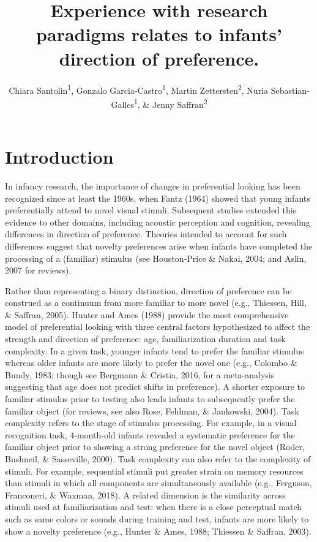 \documentclass[english,man,man,floatsintext]{apa6}
\author{Chiara Santolin\textsuperscript{1}, Gonzalo Garcia-Castro\textsuperscript{1}, Martin Zettersten\textsuperscript{2}, Nuria Sebastian-Galles\textsuperscript{1}, \& Jenny Saffran\textsuperscript{2}}
\affiliation{
\vspace{0.5cm}
\textsuperscript{1} Center for Brain and Cognition, Universitat Pompeu Fabra\\\textsuperscript{2} Waisman Center \& Department of Psychology, University of Wisconsin-Madison}
\title{Experience with research paradigms relates to infants' direction of preference.}
\date{}
\begin{document}
\maketitle

\hypertarget{introduction}{%
\section{Introduction}\label{introduction}}

In infancy research, the importance of changes in preferential looking has been recognized since at least the 1960s, when Fantz (1964) showed that young infants preferentially attend to novel visual stimuli. Subsequent studies extended this evidence to other domains, including acoustic perception and cognition, revealing differences in direction of preference. Theories intended to account for such differences suggest that novelty preferences arise when infants have completed the processing of a (familiar) stimulus (see Houston‐Price \& Nakai, 2004; and Aslin, 2007 for reviews).

Rather than representing a binary distinction, direction of preference can be construed as a continuum from more familiar to more novel (e.g., Thiessen, Hill, \& Saffran, 2005). Hunter and Ames (1988) provide the most comprehensive model of preferential looking with three central factors hypothesized to affect the strength and direction of preference: age, familiarization duration and task complexity. In a given task, younger infants tend to prefer the familiar stimulus whereas older infants are more likely to prefer the novel one (e.g., Colombo \& Bundy, 1983; though see Bergmann \& Cristia, 2016, for a meta-analysis suggesting that age does not predict shifts in preference). A shorter exposure to familiar stimulus prior to testing also leads infants to subsequently prefer the familiar object (for reviews, see also Rose, Feldman, \& Jankowski, 2004). Task complexity refers to the stage of stimulus processing. For example, in a visual recognition task, 4-month-old infants revealed a systematic preference for the familiar object prior to showing a strong preference for the novel object (Roder, Bushneil, \& Sasseville, 2000). Task complexity can also refer to the complexity of stimuli. For example, sequential stimuli put greater strain on memory resources than stimuli in which all components are simultaneously available (e.g., Ferguson, Franconeri, \& Waxman, 2018). A related dimension is the similarity across stimuli used at familiarization and test: when there is a close perceptual match such as same colors or sounds during training and test, infants are more likely to show a novelty preference (e.g., Hunter \& Ames, 1988; Thiessen \& Saffran, 2003).
\end{document}
